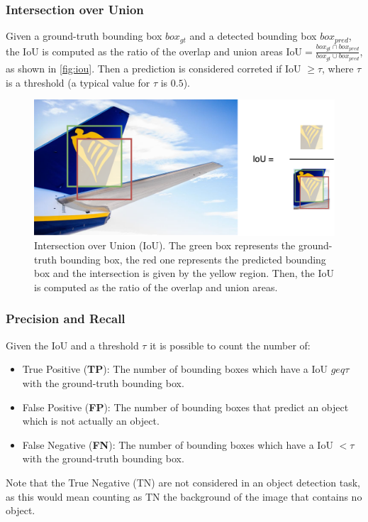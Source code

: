 \subsubsection{Intersection over Union}
Given a ground-truth bounding box $box_{gt}$ and a detected bounding box $box_{pred}$, the IoU is computed as the ratio of the overlap and union areas $\text{IoU} = \frac{box_{gt} \cap box_{pred}}{box_{gt} \cup box_{pred}}$, as shown in \autoref{fig:iou}. Then a prediction is considered correted if IoU $ \geq \tau$, where $\tau$ is a threshold (a typical value for $\tau$ is $0.5$).

\begin{figure}[H]
	\centering
    \includegraphics[width=1\textwidth]{images/iou.drawio.png}
	\caption{Intersection over Union (IoU). The green box represents the ground-truth bounding box, the red one represents the predicted bounding box and the intersection is given by the yellow region. Then, the IoU is computed as the ratio of the overlap and union areas.}
	\label{fig:iou}
\end{figure}

\subsubsection{Precision and Recall}
Given the IoU and a threshold $\tau$ it is possible to count the number of:
\begin{itemize}
    \item True Positive (\textbf{TP}): The number of bounding boxes which have a IoU $geq \tau$ with the ground-truth bounding box.
    \item False Positive (\textbf{FP}): The number of bounding boxes that predict an object which is not actually an object.
    \item False Negative (\textbf{FN}): The number of bounding boxes which have a IoU $< \tau$ with the ground-truth bounding box.
\end{itemize}
Note that the True Negative (TN) are not considered in an object detection task, as this would mean counting as TN the background of the image that contains no object.

